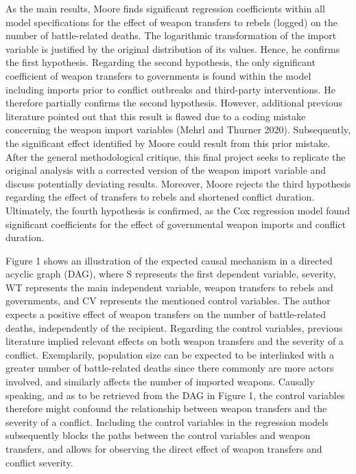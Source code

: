 \documentclass[
]{article}
\begin{document}
As the main results, Moore finds significant regression coefficients
within all model specifications for the effect of weapon transfers to
rebels (logged) on the number of battle-related deaths. The logarithmic
transformation of the import variable is justified by the original
distribution of its values. Hence, he confirms the first hypothesis.
Regarding the second hypothesis, the only significant coefficient of
weapon transfers to governments is found within the model including
imports prior to conflict outbreaks and third-party interventions. He
therefore partially confirms the second hypothesis. However, additional
previous literature pointed out that this result is flawed due to a
coding mistake concerning the weapon import variables (Mehrl and Thurner
2020). Subsequently, the significant effect identified by Moore could
result from this prior mistake. After the general methodological
critique, this final project seeks to replicate the original analysis
with a corrected version of the weapon import variable and discuss
potentially deviating results. Moreover, Moore rejects the third
hypothesis regarding the effect of transfers to rebels and shortened
conflict duration. Ultimately, the fourth hypothesis is confirmed, as
the Cox regression model found significant coefficients for the effect
of governmental weapon imports and conflict duration.

Figure 1 shows an illustration of the expected causal mechanism in a
directed acyclic graph (DAG), where S represents the first dependent
variable, severity, WT represents the main independent variable, weapon
transfers to rebels and governments, and CV represents the mentioned
control variables. The author expects a positive effect of weapon
transfers on the number of battle-related deaths, independently of the
recipient. Regarding the control variables, previous literature implied
relevant effects on both weapon transfers and the severity of a
conflict. Exemplarily, population size can be expected to be interlinked
with a greater number of battle-related deaths since there commonly are
more actors involved, and similarly affects the number of imported
weapons. Causally speaking, and as to be retrieved from the DAG in
Figure 1, the control variables therefore might confound the
relationship between weapon transfers and the severity of a conflict.
Including the control variables in the regression models subsequently
blocks the paths between the control variables and weapon transfers, and
allows for observing the direct effect of weapon transfers and conflict
severity.
\end{document}
